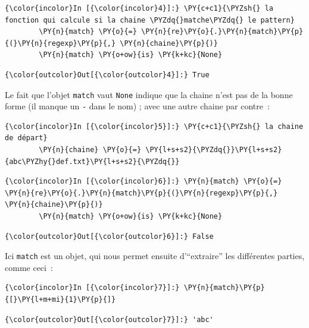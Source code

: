     \begin{Verbatim}[commandchars=\\\{\}]
{\color{incolor}In [{\color{incolor}4}]:} \PY{c+c1}{\PYZsh{} la fonction qui calcule si la chaine \PYZdq{}matche\PYZdq{} le pattern}
        \PY{n}{match} \PY{o}{=} \PY{n}{re}\PY{o}{.}\PY{n}{match}\PY{p}{(}\PY{n}{regexp}\PY{p}{,} \PY{n}{chaine}\PY{p}{)}
        \PY{n}{match} \PY{o+ow}{is} \PY{k+kc}{None}
\end{Verbatim}


\begin{Verbatim}[commandchars=\\\{\}]
{\color{outcolor}Out[{\color{outcolor}4}]:} True
\end{Verbatim}
            
    Le fait que l'objet \texttt{match} vaut \texttt{None} indique que la
chaine n'est pas de la bonne forme (il manque un \texttt{-} dans le nom)
; avec une autre chaine par contre~:

    \begin{Verbatim}[commandchars=\\\{\}]
{\color{incolor}In [{\color{incolor}5}]:} \PY{c+c1}{\PYZsh{} la chaine de départ}
        \PY{n}{chaine} \PY{o}{=} \PY{l+s+s2}{\PYZdq{}}\PY{l+s+s2}{abc\PYZhy{}def.txt}\PY{l+s+s2}{\PYZdq{}}
\end{Verbatim}


    \begin{Verbatim}[commandchars=\\\{\}]
{\color{incolor}In [{\color{incolor}6}]:} \PY{n}{match} \PY{o}{=} \PY{n}{re}\PY{o}{.}\PY{n}{match}\PY{p}{(}\PY{n}{regexp}\PY{p}{,} \PY{n}{chaine}\PY{p}{)}
        \PY{n}{match} \PY{o+ow}{is} \PY{k+kc}{None}
\end{Verbatim}


\begin{Verbatim}[commandchars=\\\{\}]
{\color{outcolor}Out[{\color{outcolor}6}]:} False
\end{Verbatim}
            
    Ici \texttt{match} est un objet, qui nous permet ensuite d'``extraire''
les différentes parties, comme ceci~:

    \begin{Verbatim}[commandchars=\\\{\}]
{\color{incolor}In [{\color{incolor}7}]:} \PY{n}{match}\PY{p}{[}\PY{l+m+mi}{1}\PY{p}{]}
\end{Verbatim}


\begin{Verbatim}[commandchars=\\\{\}]
{\color{outcolor}Out[{\color{outcolor}7}]:} 'abc'
\end{Verbatim}
            

